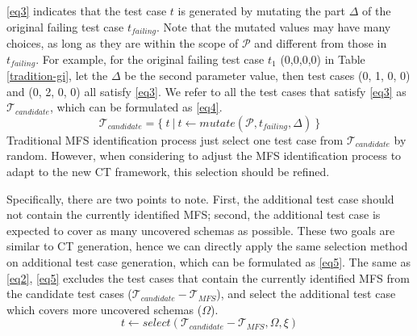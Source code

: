 \documentclass{sig-alternate}
\begin{document}
\ref{eq3} indicates that the test case $t$ is generated by mutating the part $\Delta$ of the original failing test case $t_{failing}$. Note that the mutated values may have many choices, as long as they are within the scope of $\mathcal{P}$ and different from those in $t_{failing}$. For example, for the original failing test case $t_{1}$ (0,0,0,0) in Table \ref{tradition-gi}, let the $\Delta$ be the second parameter value, then test cases (0, 1, 0, 0) and (0, 2, 0, 0) all satisfy \ref{eq3}. We refer to all the test cases that satisfy \ref{eq3} as $\mathcal{T}_{candidate}$, which can be formulated  as   \ref{eq4}.
\begin{displaymath}\mathcal{T}_{candidate} =  \{\ t\ |\ t \leftarrow  mutate (\mathcal{P}, t_{failing}, \Delta )\ \} \tag{EQ4} \label{eq4} \end{displaymath}
Traditional MFS identification process just select one test case from $\mathcal{T}_{candidate}$ by random. However, when considering to adjust the MFS identification process to adapt to the new CT framework, this selection should be refined.

Specifically, there are two points to note. First, the additional test case should not contain the currently identified MFS; second, the additional test case is expected to cover as many uncovered schemas as possible. These two goals are similar to CT generation, hence we can directly apply the same selection method on additional test case generation, which can be formulated as \ref{eq5}.  The same as \ref{eq2}, \ref{eq5} excludes the test cases that contain the currently identified MFS from the candidate test cases ($\mathcal{T}_{candidate} - \mathcal{T}_{MFS}$), and select the additional test case which covers more uncovered schemas ($\Omega$).
\begin{displaymath}t \leftarrow  select (\mathcal{T}_{candidate} - \mathcal{T}_{MFS}, \Omega ,  \xi )  \tag{EQ5} \label{eq5} \end{displaymath}



\end{document}
